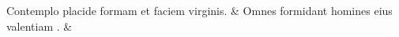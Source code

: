\documentclass[12pt,onecolumn,twoside,a4paper]{memoir}
\begin{document}
               \begin{pairs}
                  \begin{Leftside}
			\beginnumbering
			\setcounter{stanzaL}{0}
                     
                         \stanza {}
                     
                              Contemplo
                              placide
                              formam
                              et
                              faciem
                              virginis. \&
                         \stanza {}
                     Omnes
                              formidant
                              homines
                              eius
                              valentiam
                              . \&
                         \stanza {}
                     

\end{Leftside}
\end{pairs}
\end{document}
